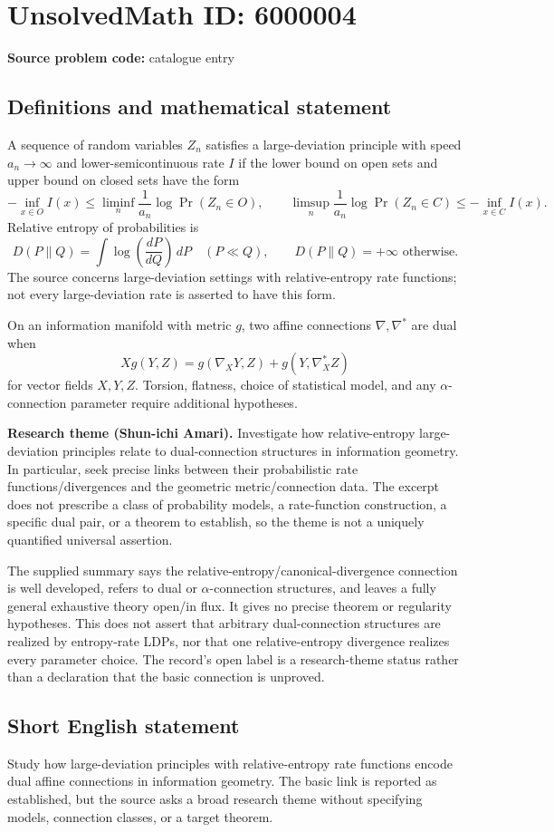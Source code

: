 \documentclass[11pt]{article}
\begin{document}
\section*{UnsolvedMath ID: 6000004}
\textbf{Source problem code:} catalogue entry
\subsection{Definitions and mathematical statement}
A sequence of random variables $Z_n$ satisfies a large-deviation principle with speed $a_n\to\infty$ and lower-semicontinuous rate $I$ if the lower bound on open sets and upper bound on closed sets have the form
\[
 -\inf_{x\in O}I(x)\leq\liminf_n\frac1{a_n}\log\Pr(Z_n\in O),
 \qquad
 \limsup_n\frac1{a_n}\log\Pr(Z_n\in C)\leq-\inf_{x\in C}I(x).
\]
Relative entropy of probabilities is
\[
 D(P\|Q)=\int\log\left(\frac{dP}{dQ}\right)\,dP
 \quad(P\ll Q),\qquad D(P\|Q)=+\infty\text{ otherwise}.
\]
The source concerns large-deviation settings with relative-entropy rate functions; not every large-deviation rate is asserted to have this form.

On an information manifold with metric $g$, two affine connections $\nabla,\nabla^*$ are dual when
\[
 Xg(Y,Z)=g(\nabla_XY,Z)+g(Y,\nabla_X^*Z)
\]
for vector fields $X,Y,Z$. Torsion, flatness, choice of statistical model, and any $\alpha$-connection parameter require additional hypotheses.

\textbf{Research theme (Shun-ichi Amari).} Investigate how relative-entropy large-deviation principles relate to dual-connection structures in information geometry. In particular, seek precise links between their probabilistic rate functions/divergences and the geometric metric/connection data. The excerpt does not prescribe a class of probability models, a rate-function construction, a specific dual pair, or a theorem to establish, so the theme is not a uniquely quantified universal assertion.

The supplied summary says the relative-entropy/canonical-divergence connection is well developed, refers to dual or $\alpha$-connection structures, and leaves a fully general exhaustive theory open/in flux. It gives no precise theorem or regularity hypotheses. This does not assert that arbitrary dual-connection structures are realized by entropy-rate LDPs, nor that one relative-entropy divergence realizes every parameter choice. The record's open label is a research-theme status rather than a declaration that the basic connection is unproved.
\subsection{Short English statement}
Study how large-deviation principles with relative-entropy rate functions encode dual affine connections in information geometry. The basic link is reported as established, but the source asks a broad research theme without specifying models, connection classes, or a target theorem.
\end{document}
